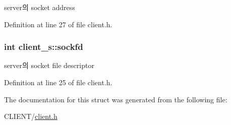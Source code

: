 server의 socket address 



Definition at line 27 of file client.\-h.

\hypertarget{structclient__s_a409a70b3071eaf5be18d0439d256756a}{
\subsubsection[{sockfd}]{\setlength{\rightskip}{0pt plus 5cm}int client\-\_\-s\-::sockfd}}\label{structclient__s_a409a70b3071eaf5be18d0439d256756a}


server의 socket file descriptor 



Definition at line 25 of file client.\-h.



The documentation for this struct was generated from the following file\-:\begin{DoxyCompactItemize}
\item 
C\-L\-I\-E\-N\-T/\hyperlink{client_8h}{client.\-h}\end{DoxyCompactItemize}
